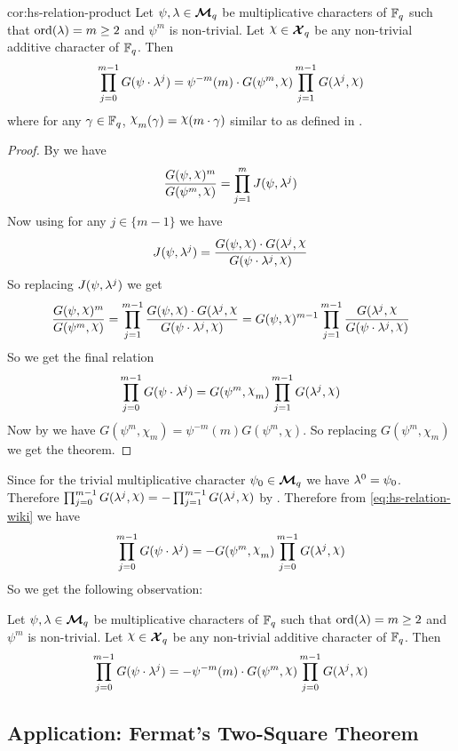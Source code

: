 \begin{corolary}{}{cor:hs-relation-product}
   Let $\psi,\lambda\in\boldsymbol{\mathcal{M}}_q$ be multiplicative characters of $\mathbb{F}_q$ such that $\operatorname{ord}(\lambda)=m\geq 2$ and $\psi^m$ is non-trivial. Let $\chi\in\Xq$ be any non-trivial additive character of $\mathbb{F}_q$. Then $$\prod_{j=0}^{m-1}G(\psi\cdot \lm^j)=\psi^{-m}(m)\cdot G(\psi^m,\chi)\prod_{j=1}^{m-1}G(\lm^j,\chi)$$where for any $\gamma\in\mathbb{F}_q$, $\chi_m(\gm)=\chi(m\cdot \gm)$ similar to as defined in \AddCharDefthm.
\end{corolary}
\begin{proof}
  By \DHprodthm we have $$\frac{G(\psi,\chi)^m}{G(\psi^m,\chi)}=\prod_{j=1}^mJ(\psi,\lm^j)$$Now  using \JGrelthm for any $j\in\{m-1\}$ we have $$J(\psi,\lm^j)=\frac{G(\psi,\chi)\cdot G(\lm^j,\chi}{G(\psi\cdot\lm^j,\chi)}$$So replacing $J(\psi,\lambda^j)$ we get
  $$ \frac{G(\psi,\chi)^m}{G(\psi^m,\chi)}  = \prod_{j=1}^{m-1}\frac{G(\psi,\chi)\cdot G(\lm^j,\chi}{G(\psi\cdot\lm^j,\chi)}=G(\psi,\chi)^{m-1}\prod_{j=1}^{m-1}\frac{ G(\lm^j,\chi}{G(\psi\cdot\lm^j,\chi)}$$So we get the final relation \begin{equation}\label{eq:hs-relation-wiki}
    \prod_{j=0}^{m-1}G(\psi\cdot \lm^j)=G(\psi^m,\chi_m)\prod_{j=1}^{m-1}G(\lm^j,\chi)
  \end{equation}
  Now by \GSidentitieslem[(i)] we have $G(\psi^m,\chi_m)=\psi^{-m}(m)G(\psi^m,\chi)$. So replacing $G(\psi^m,\chi_m)$ we get the theorem. 
\end{proof}

Since for the trivial multiplicative character $\psi_0\in\boldsymbol{\mathcal{M}}_q$ we have $\lambda^0=\psi_0$. Therefore $\prod_{j=0}^{m-1}G(\lm^j,\chi)=-\prod_{j=1}^{m-1}G(\lm^j,\chi)$ by \GSpropthm. Therefore from \eqref{eq:hs-relation-wiki} we have $$\prod_{j=0}^{m-1}G(\psi\cdot \lm^j)=-G(\psi^m,\chi_m)\prod_{j=0}^{m-1}G(\lm^j,\chi)$$ So we get the following observation:
\begin{observation}\label{obs:gauss-product-sign}
  Let $\psi,\lambda\in\boldsymbol{\mathcal{M}}_q$ be multiplicative characters of $\mathbb{F}_q$ such that $\operatorname{ord}(\lambda)=m\geq 2$ and $\psi^m$ is non-trivial. Let $\chi\in\Xq$ be any non-trivial additive character of $\mathbb{F}_q$. Then $$\prod_{j=0}^{m-1}G(\psi\cdot \lm^j)=-\psi^{-m}(m)\cdot G(\psi^m,\chi)\prod_{j=0}^{m-1}G(\lm^j,\chi)$$
\end{observation}
\subsection{Application: Fermat's Two-Square Theorem}

